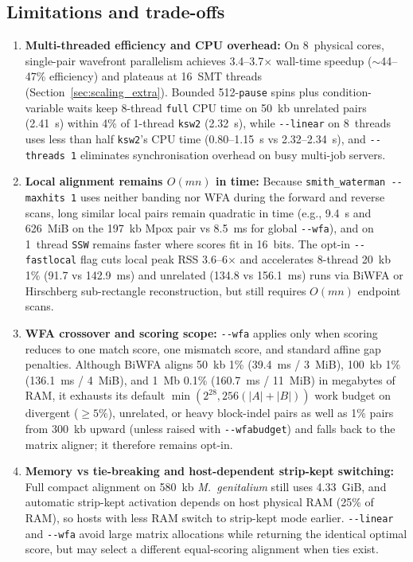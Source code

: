 \documentclass[11pt,a4paper]{article}
\begin{document}
\subsection{Limitations and trade-offs}

\begin{enumerate}
  \item \textbf{Multi-threaded efficiency and CPU overhead:} On 8~physical cores, single-pair wavefront parallelism achieves 3.4--3.7$\times$ wall-time speedup ($\sim$44--47\% efficiency) and plateaus at 16~SMT threads (Section~\ref{sec:scaling_extra}). Bounded 512-\texttt{pause} spins plus condition-variable waits keep 8-thread \texttt{full} CPU time on 50~kb unrelated pairs (2.41~s) within 4\% of 1-thread \texttt{ksw2} (2.32~s), while \texttt{-{}-linear} on 8~threads uses less than half \texttt{ksw2}'s CPU time (0.80--1.15~s vs 2.32--2.34~s), and \texttt{-{}-threads 1} eliminates synchronisation overhead on busy multi-job servers.
  \item \textbf{Local alignment remains $O(mn)$ in time:} Because \texttt{smith\_waterman -{}-maxhits 1} uses neither banding nor WFA during the forward and reverse scans, long similar local pairs remain quadratic in time (e.g., 9.4~s and 626~MiB on the 197~kb Mpox pair vs 8.5~ms for global \texttt{-{}-wfa}), and on 1~thread \texttt{SSW} remains faster where scores fit in 16~bits. The opt-in \texttt{-{}-fastlocal} flag cuts local peak RSS 3.6--6$\times$ and accelerates 8-thread 20~kb 1\% (91.7 vs 142.9~ms) and unrelated (134.8 vs 156.1~ms) runs via BiWFA or Hirschberg sub-rectangle reconstruction, but still requires $O(mn)$ endpoint scans.
  \item \textbf{WFA crossover and scoring scope:} \texttt{-{}-wfa} applies only when scoring reduces to one match score, one mismatch score, and standard affine gap penalties. Although BiWFA aligns 50~kb 1\% (39.4~ms / 3~MiB), 100~kb 1\% (136.1~ms / 4~MiB), and 1~Mb 0.1\% (160.7~ms / 11~MiB) in megabytes of RAM, it exhausts its default $\min(2^{28}, 256(|A|+|B|))$ work budget on divergent ($\ge 5\%$), unrelated, or heavy block-indel pairs as well as 1\% pairs from 300~kb upward (unless raised with \texttt{-{}-wfabudget}) and falls back to the matrix aligner; it therefore remains opt-in.
  \item \textbf{Memory vs tie-breaking and host-dependent strip-kept switching:} Full compact alignment on 580~kb \textit{M.~genitalium} still uses 4.33~GiB, and automatic strip-kept activation depends on host physical RAM (25\% of RAM), so hosts with less RAM switch to strip-kept mode earlier. \texttt{-{}-linear} and \texttt{-{}-wfa} avoid large matrix allocations while returning the identical optimal score, but may select a different equal-scoring alignment when ties exist.

\end{enumerate}
\end{document}
